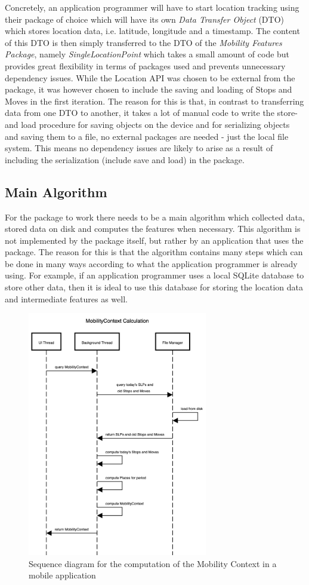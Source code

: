 Concretely, an application programmer will have to start location tracking using their package of choice which will have its own \textit{Data Transfer Object} (DTO) which stores location data, i.e. latitude, longitude and a timestamp. The content of this DTO is then simply transferred to the DTO of the \textit{Mobility Features Package}, namely \textit{SingleLocationPoint} which takes a small amount of code but provides great flexibility in terms of packages used and prevents unnecessary dependency issues. While the Location API was chosen to be external from the package, it was however chosen to include the saving and loading of Stops and Moves in the first iteration. The reason for this is that, in contrast to transferring data from one DTO to another, it takes a lot of manual code to write the store- and load procedure for saving objects on the device and for serializing objects and saving them to a file, no external packages are needed - just the local file system. This means no dependency issues are likely to arise as a result of including the serialization (include save and load) in the package.

\subsection{Main Algorithm}
For the package to work there needs to be a main algorithm which collected data, stored data on disk and computes the features when necessary. This algorithm is not implemented by the package itself, but rather by an application that uses the package. The reason for this is that the algorithm contains many steps which can be done in many ways according to what the application programmer is already using. For example, if an application programmer uses a local SQLite database to store other data, then it is ideal to use this database for storing the location data and intermediate features as well.

\begin{figure}
    \centering
    \includegraphics[width=0.7\textwidth]{images/diagrams/sequence.png}
    \caption{Sequence diagram for the computation of the Mobility Context in a mobile application}
    \label{fig:sequence-diagram-mobility-context}
\end{figure}
